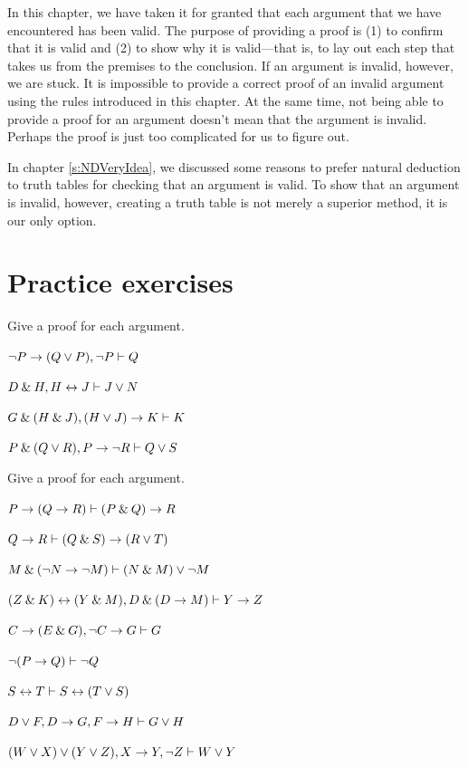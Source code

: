 In this chapter, we have taken it for granted that each argument that we have encountered has been valid. The purpose of providing a proof is (1) to confirm that it is valid and (2) to show why it is valid---that is, to lay out each step that takes us from the premises to the conclusion. If an argument is invalid, however, we are stuck. It is impossible to provide a correct proof of an invalid argument using the rules introduced in this chapter. At the same time, not being able to provide a proof for an argument doesn't mean that the argument is invalid. Perhaps the proof is just too complicated for us to figure out. 

In chapter \ref{s:NDVeryIdea}, we discussed some reasons to prefer natural deduction to truth tables for checking that an argument is valid. To show that an argument is invalid, however, creating a truth table is not merely a superior method, it is our only option.



\section{Practice exercises}
\setcounter{ProbPart}{0}

\problempart
Give a proof for each argument.
\begin{earg}
\item ${\neg} P \rightarrow (Q \vee P), {\neg} P \vdash Q$\smallskip
\item $D \mathbin{\&} H, H \leftrightarrow J  \vdash J \vee N$\smallskip 
\item $G \mathbin{\&} (H \mathbin{\&} J), (H \vee J) \rightarrow K \vdash K$\smallskip
\item $P \mathbin{\&} (Q \vee R), P \rightarrow {\neg} R \vdash Q \vee S$\smallskip
\end{earg}


\problempart
Give a proof for each argument.
\begin{earg}
\item $P \rightarrow (Q \rightarrow R) \vdash (P \mathbin{\&} Q) \rightarrow R$\smallskip
\item $Q \rightarrow R \vdash (Q \mathbin{\&} S) \rightarrow (R \vee T)$\smallskip 
\item $M \mathbin{\&} ({\neg} N \rightarrow {\neg} M) \vdash (N \mathbin{\&} M) \vee {\neg} M$\smallskip
\item $(Z\mathbin{\&} K)\leftrightarrow(Y\mathbin{\&} M), D\mathbin{\&}(D\rightarrow M) \vdash Y\rightarrow Z$\smallskip
\item $C\rightarrow(E\mathbin{\&} G), {\neg} C \rightarrow G \vdash G$\smallskip
\item ${\neg}(P \rightarrow Q) \vdash {\neg} Q$\smallskip
\item $S \leftrightarrow T \vdash S \leftrightarrow (T \vee S)$\smallskip 
\item $D \vee F, D \rightarrow G, F \rightarrow H \vdash G \vee H$\smallskip
\item $(W \vee X) \vee (Y \vee Z), X\rightarrow Y, {\neg} Z \vdash W\vee Y$
\end{earg}


